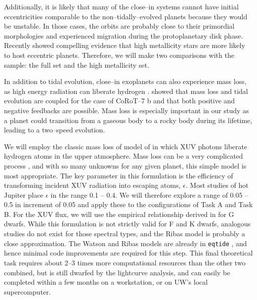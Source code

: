 Additionally, it is likely that many of the close--in systems cannot
have initial eccentricities comparable to the non--tidally--evolved
planets because they would be unstable.  In those cases, the orbits
are probably close to their primordial morphologies and experienced
migration during the protoplanetary disk phase.  Recently
\cite{DawsonMurrayClay13} showed compelling evidence that high
metallicity stars are more likely to host eccentric planets.
Therefore, we will make two comparisons with the \kepler sample: the
full set and the high metallicity set.

\medskip
{\centerline{}}
\smallskip

In addition to tidal evolution, close--in exoplanets can also
experience mass loss, as high energy radiation can liberate hydrogen
\citep{Watson81,VidalMadjar03}.  \cite{Jackson10} showed that mass
loss and tidal evolution are coupled for the case of CoRoT--7 b and
that both positive and negative feedbacks are possible.  Mass loss is
especially important in our study as a planet could transition from a
gaseous body to a rocky body during its lifetime, leading to a
two--speed evolution.

We will employ the classic mass loss of model of \cite{Watson81} in
which XUV photons liberate hydrogen atoms in the upper atmosphere.
Mass loss can be a very complicated process
\citep{Yelle04,Lammer07,Khodachenko07,Leitzinger11,Lammer13}, and with
so many unknowns for any given planet, this simple model is most
appropriate.  The key parameter in this formulation is the efficiency
of transforming incident XUV radiation into escaping atoms,
$\epsilon$.  Most studies of hot Jupiter place $\epsilon$ in the range
0.1 -- 0.4.  We will therefore explore a range of 0.05 -- 0.5 in
increment of 0.05 and apply these to the configurations of Task A and
Task B.  For the XUV flux, we will use the empirical relationship
derived in \cite{Ribas05} for G dwarfs.  While this formulation is not
strictly valid for F and K dwarfs, analogous studies do not exist for
those spectral types, and the Ribas model is probably a close
approximation.  The Watson and Ribas models are already in
\texttt{eqtide} \citep{Barnes13}, and hence minimal code improvements
are required for this step.  This final theoretical task requires
about 2--3 times more computational resources than the other two
combined, but is still dwarfed by the \kepler lightcurve analysis, and
can easily be completed within a few months on a workstation, or on
UW's local supercomputer.

